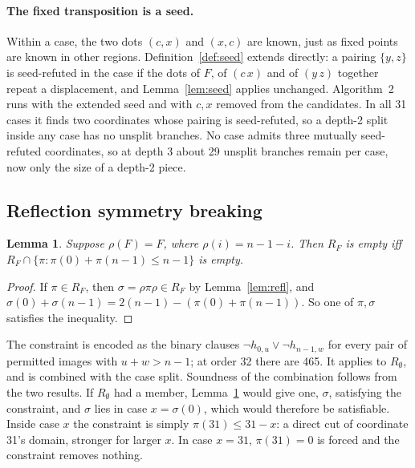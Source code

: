 \documentclass[11pt,a4paper]{article}
\newtheorem{lemma}[theorem]{Lemma}
\theoremstyle{definition}
\begin{document}
\paragraph{The fixed transposition is a seed.} Within a case, the two dots $(c,x)$ and $(x,c)$
are known, just as fixed points are known in other regions. Definition~\ref{def:seed} extends
directly: a pairing $\{y,z\}$ is seed-refuted in the case if the dots of $F$, of $(c\,x)$ and of
$(y\,z)$ together repeat a displacement, and Lemma~\ref{lem:seed} applies unchanged.
Algorithm~2 runs with the extended seed and with $c,x$ removed from the candidates. In all 31
cases it finds two coordinates whose pairing is seed-refuted, so a depth-2 split inside any
case has no unsplit branches. No case admits three mutually seed-refuted coordinates, so at
depth 3 about 29 unsplit branches remain per case, now only the size of a depth-2 piece.

\subsection{Reflection symmetry breaking}

\begin{lemma}\label{lem:sb}
Suppose $\rho(F)=F$, where $\rho(i)=n-1-i$. Then $R_F$ is empty iff
$R_F\cap\{\pi:\pi(0)+\pi(n-1)\le n-1\}$ is empty.
\end{lemma}
\begin{proof}
If $\pi\in R_F$, then $\sigma=\rho\pi\rho\in R_F$ by Lemma~\ref{lem:refl}, and
$\sigma(0)+\sigma(n-1)=2(n-1)-(\pi(0)+\pi(n-1))$. So one of $\pi,\sigma$ satisfies the
inequality.
\end{proof}

The constraint is encoded as the binary clauses $\neg h_{0,u}\vee\neg h_{n-1,w}$ for every
pair of permitted images with $u+w>n-1$; at order 32 there are 465. It applies to
$R_\emptyset$, and is combined with the case split. Soundness of the combination follows from
the two results. If $R_\emptyset$ had a member, Lemma~\ref{lem:sb} would give one, $\sigma$,
satisfying the constraint, and $\sigma$ lies in case $x=\sigma(0)$, which would therefore be
satisfiable. Inside case $x$ the constraint is simply $\pi(31)\le31-x$: a direct cut of
coordinate 31's domain, stronger for larger $x$. In case $x=31$, $\pi(31)=0$ is forced and the
constraint removes nothing.
\end{document}
